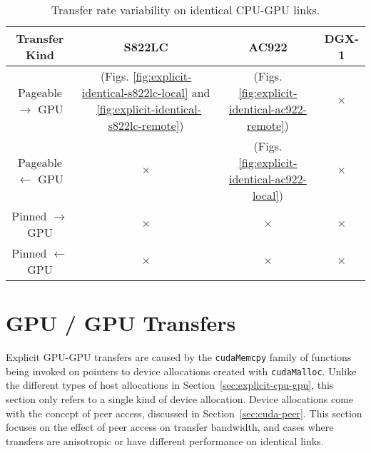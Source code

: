 \begin{table}[ht]
	\centering
	\caption[Transfer rate on identical CPU-GPU links]{Transfer rate variability on identical CPU-GPU links.}
	\label{tab:explicit-identical}
	\begin{tabular}{cccc}
		\hline
		\textbf{Transfer Kind}     & \textbf{S822LC}                                                                                              & \textbf{AC922}                                               & \textbf{DGX-1} \\ \hline 
		Pageable $\rightarrow$ GPU & \checkmark (Figs. \ref{fig:explicit-identical-s822lc-local} and ~\ref{fig:explicit-identical-s822lc-remote}) & \checkmark (Figs. \ref{fig:explicit-identical-ac922-remote}) & $\times$       \\ \hline
		Pageable $\leftarrow$ GPU  & $\times$                                                                                                     & \checkmark (Figs. \ref{fig:explicit-identical-ac922-local})  & $\times$       \\ \hline
		Pinned $\rightarrow$ GPU   & $\times$                                                                                                     & $\times$                                                     & $\times$       \\ \hline
		Pinned $\leftarrow$ GPU    & $\times$                                                                                                     & $\times$                                                     & $\times$       \\ \hline
	\end{tabular}
\end{table}

\section{GPU / GPU Transfers}
\label{sec:explicit-gpu-gpu}

Explicit GPU-GPU transfers are caused by the \texttt{cudaMemcpy} family of functions being invoked on pointers to device allocations created with \texttt{cudaMalloc}.
Unlike the different types of host allocations in Section~\ref{sec:explicit-cpu-gpu}, this section only refers to a single kind of device allocation.
Device allocations come with the concept of peer access, discussed in Section~\ref{sec:cuda-peer}.
This section focuses on the effect of peer access on transfer bandwidth, and cases where transfers are anisotropic or have different performance on identical links.

